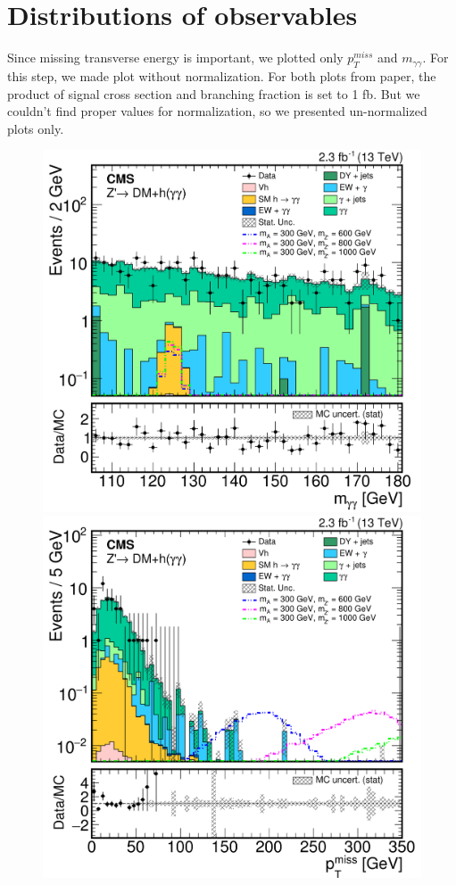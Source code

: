\documentclass[12pt,A4paper]{article}
\begin{document}
\section{Distributions of observables}
Since missing transverse energy is important, we plotted only $ p_T^{miss}$ and $m_{\gamma\gamma}$. For this step, we made plot without normalization. For both plots from paper, the product of signal cross section and branching fraction is set to 1 fb. But we couldn't find proper values for normalization, so we presented un-normalized plots only.
\begin{figure}[h!]
\centering
\begin{minipage}{.5\textwidth}
  \centering
  \includegraphics[scale=0.08]{img/CMS-EXO-16-012_Figure_007-a.png}
\end{minipage}%
\begin{minipage}{.5\textwidth}
  \centering
  \includegraphics[scale=0.08]{img/CMS-EXO-16-012_Figure_007-b.png}

\end{minipage}
\end{figure}
\end{document}
